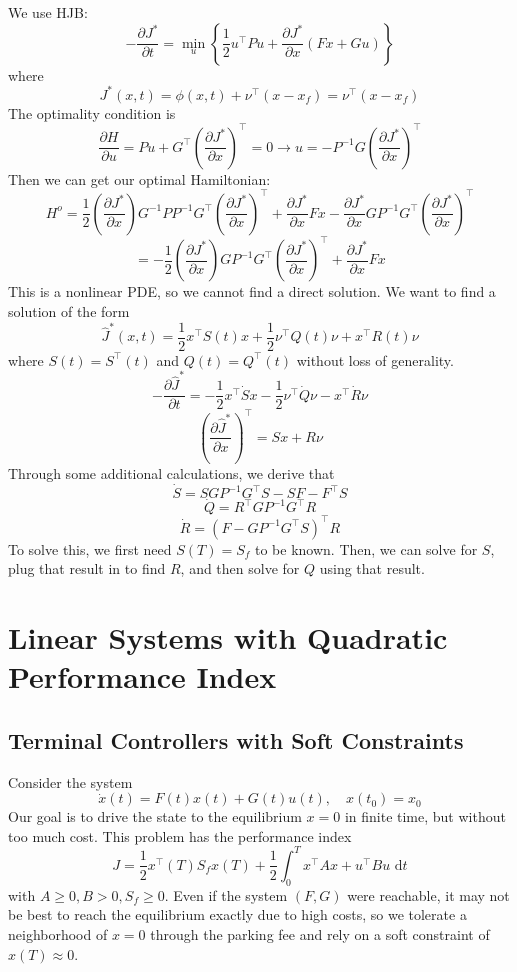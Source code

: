 \documentclass{article}
\begin{document}
\noindent
We use HJB:
\[-\frac{\partial J^*}{\partial t} = \min_{u}\left\{\frac{1}{2}u^\top Pu
+ \frac{\partial J^*}{\partial x}(Fx+Gu)\right\}\]
where
\[J^*(x,t) = \phi(x,t) + \nu^\top(x-x_f) = \nu^\top(x-x_f)\]
The optimality condition is
\[\frac{\partial H}{\partial u} = Pu + G^\top\left(\frac{\partial J^*}{\partial x}\right)^\top
= 0 \rightarrow u = -P^{-1}G\left(\frac{\partial J^*}{\partial x}\right)^\top\]
Then we can get our optimal Hamiltonian:
\[H^o = \frac{1}{2}\left(\frac{\partial J^*}{\partial x}\right)G^{-1}PP^{-1}G^\top
\left(\frac{\partial J^*}{\partial x}\right)^\top + \frac{\partial J^*}{\partial x}Fx
- \frac{\partial J^*}{\partial x}GP^{-1}G^\top\left(\frac{\partial J^*}{\partial x}\right)^\top\]
\[= -\frac{1}{2}\left(\frac{\partial J^*}{\partial x}\right)GP^{-1}
G^\top\left(\frac{\partial J^*}{\partial x}\right)^\top + \frac{\partial J^*}{\partial x}Fx\]
This is a nonlinear PDE, so we cannot find a direct solution. We want to find a solution
of the form
\[\hat{J}^*(x,t) = \frac{1}{2}x^\top S(t)x + \frac{1}{2}\nu^\top Q(t)\nu + x^\top R(t)\nu\]
where $S(t) = S^\top(t)$ and $Q(t) = Q^\top(t)$ without loss of generality.
\[-\frac{\partial\hat{J}^*}{\partial t} = -\frac{1}{2}x^\top\dot{S}x
- \frac{1}{2}\nu^\top\dot{Q}\nu - x^\top\dot{R}\nu\]
\[\left(\frac{\partial\hat{J}^*}{\partial x}\right)^\top = Sx + R\nu\]
Through some additional calculations, we derive that
\[\dot{S} = SGP^{-1}G^\top S - SF - F^\top S\]
\[\dot{Q} = R^\top GP^{-1}G^\top R\]
\[\dot{R} = (F-GP^{-1}G^\top S)^\top R\]
To solve this, we first need $S(T) = S_f$ to be known. Then, we can solve for $S$,
plug that result in to find $R$, and then solve for $Q$ using that result.

\section{Linear Systems with Quadratic Performance Index}

\subsection{Terminal Controllers with Soft Constraints}

\noindent
Consider the system
\[\dot{x}(t) = F(t)x(t) + G(t)u(t), \quad x(t_0) = x_0\]
Our goal is to drive the state to the equilibrium $x = 0$ in finite time,
but without too much cost. This problem has the performance index
\[J = \frac{1}{2}x^\top(T)S_f x(T) + \frac{1}{2}\int_{0}^{T}x^\top Ax + u^\top Bu\text{ d}t\]
with $A \ge 0, B > 0, S_f \ge 0$.
Even if the system $(F,G)$ were reachable, it may not be best to reach the equilibrium
exactly due to high costs, so we tolerate a neighborhood of $x = 0$ through the parking fee
and rely on a soft constraint of $x(T) \approx 0$.
\end{document}
